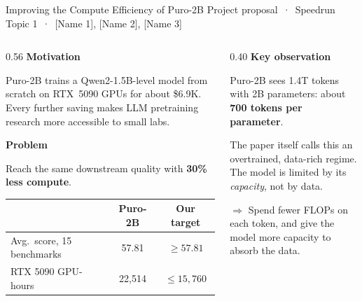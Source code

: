 \documentclass[aspectratio=169,10pt]{beamer}
\newcommand{\hl}[1]{\textcolor{accent}{\textbf{#1}}}
\newcommand{\head}[1]{\textbf{#1}\par\smallskip}
\newcommand{\team}{[Name 1], [Name 2], [Name 3]}
\begin{document}
\begin{frame}{Improving the Compute Efficiency of Puro-2B}
{\small\color{muted} Project proposal \,·\, Speedrun Topic 1 \,·\, \team}
\medskip

\begin{columns}[T,onlytextwidth]
\begin{column}{0.56\textwidth}
\head{Motivation}
Puro-2B trains a Qwen2-1.5B-level model from scratch on RTX~5090 GPUs for
about \$6.9K. Every further saving makes LLM pretraining research more
accessible to small labs.

\medskip
\head{Problem}
Reach the same downstream quality with \hl{30\% less compute}.

\medskip
{\small
\begin{tabular}{@{}lcc@{}}
\toprule
 & Puro-2B & Our target \\
\midrule
Avg.\ score, 15 benchmarks & 57.81 & $\ge 57.81$ \\
RTX 5090 GPU-hours & 22{,}514 & $\le 15{,}760$ \\
\bottomrule
\end{tabular}}
\end{column}
\begin{column}{0.40\textwidth}
\head{Key observation}
Puro-2B sees 1.4T tokens with 2B parameters: about
\hl{700 tokens per parameter}.

\medskip
The paper itself calls this an overtrained, data-rich regime. The model is
limited by its \emph{capacity}, not by data.

\medskip
$\Rightarrow$ Spend fewer FLOPs on each token, and give the model more
capacity to absorb the data.
\end{column}
\end{columns}
\end{frame}
\end{document}
